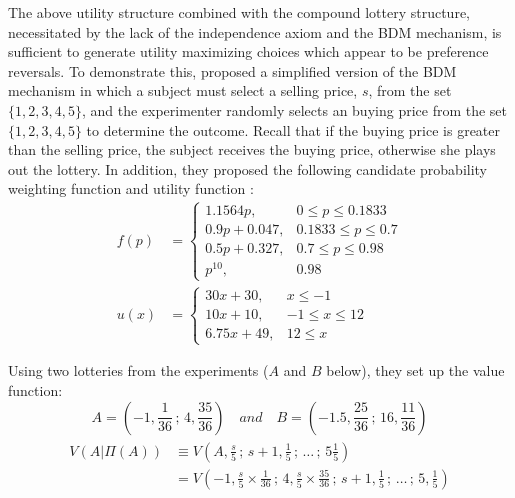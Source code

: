 \documentclass[../main.tex]{subfiles}
\begin{document}
The above utility structure combined with the compound lottery structure, necessitated by the lack of the independence axiom and the BDM mechanism, is sufficient to generate utility maximizing choices which appear to be preference reversals. To demonstrate this, \textcite{Karni1987} proposed a simplified version of the BDM mechanism in which a subject must select a selling price, $s$, from the set $\lbrace 1,2,3,4,5\rbrace$, and the experimenter randomly selects an buying price from the set $\lbrace 1,2,3,4,5 \rbrace$ to determine the outcome.
Recall that if the buying price is greater than the selling price, the subject receives the buying price, otherwise she plays out the lottery.
In addition, they proposed the following candidate probability weighting function and utility function :
\begin{align}
	f(p) &= 
	\begin{cases} 
		1.1564 p,     & 0 \leq p \leq 0.1833 \\
		0.9p + 0.047, & 0.1833 \leq p \leq 0.7 \\
		0.5p + 0.327, & 0.7 \leq p \leq 0.98 \\
		p^10,         & 0.98
	\end{cases}\label{eq:KS1987-pw}\\
	u(x) &= 
	\begin{cases} 
		30x + 30,     & x \leq -1 \\
		10x + 10,     & -1 \leq x \leq 12 \\
		6.75x + 49,   & 12 \leq x
	\end{cases}\label{eq:KS1987-ux}
\end{align}

Using two lotteries from the \textcite{Grether1979} experiments ($A$ and $B$ below), they set up the value function:
\begin{equation}
	\label{eq:KS1987-Alot}
	A = ( -1, \frac{1}{36} \,;\, 4, \frac{35}{36}) \quad \textit{and} \quad B=(-1.5, \frac{25}{36} \,;\, 16, \frac{11}{36})
\end{equation}
\begin{align}
	\label{eq:KS1987-VA}
	\begin{split}
		V(A|\Pi(A)) &\equiv V \left( A,\frac{s}{5} \,;\, s+1, \frac{1}{5} \,;\, \ldots \,;\, 5 \frac{1}{5} \right)\\
		            &=      V \left(-1,\frac{s}{5} \times \frac{1}{36} \,;\, 4, \frac{s}{5}\times \frac{35}{36} \,;\, s+1, \frac{1}{5} \,;\, \ldots \,;\, 5,\frac{1}{5}  \right)
	\end{split}
\end{align}
\end{document}

